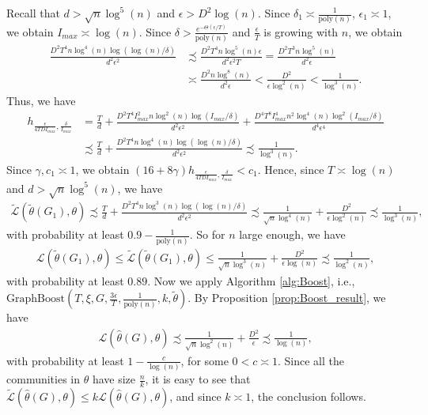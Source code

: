 \documentclass{article}
\newcommand{\thetahat}{\ensuremath{\widehat{\theta}}}
\begin{document}
Recall that $d > \sqrt{n}\log^5(n)$ and $\epsilon > D^2\log(n)$. Since $\delta_1 \asymp \frac{1}{\mathrm{poly}(n)}$, $\epsilon_1 \asymp 1$, we obtain $I_{max} \asymp \log(n)$. Since $\delta > \frac{e^{-\Theta(\epsilon/T)}}{\mathrm{poly}(n)}$ and $\frac{\epsilon}{T}$ is growing with $n$, we obtain
\begin{align*}
\frac{D^2T^4n\log^4(n)\log(\log(n)/\delta)}{d^2\epsilon^2} & \precsim \frac{D^2T^4n\log^5(n)\epsilon}{d^2\epsilon^2T} = \frac{D^2T^3n\log^5(n)}{d^2\epsilon} \\
%
& \asymp \frac{D^2n\log^8(n)}{d^2\epsilon} < \frac{D^2}{\epsilon\log^2(n)} < \frac{1}{\log^3(n)}.
\end{align*}
Thus, we have
\begin{align*}
h_{\frac{\epsilon}{4TDI_{max}}, \frac{\delta}{I_{max}}} &= \frac{T}{d} + \frac{D^2T^4I_{max}^2n\log^2(n)\log(I_{max}/\delta)}{d^2\epsilon^2} + \frac{D^4T^8I_{max}^4n^2\log^4(n)\log^2(I_{max}/\delta)}{d^4\epsilon^4}\\
&\precsim \frac{T}{d} + \frac{D^2T^4n\log^4(n)\log(\log(n)/\delta)}{d^2\epsilon^2} \precsim \frac{1}{\log^3(n)}.
\end{align*}
Since $\gamma, c_1 \asymp 1$, we obtain $(16 + 8\gamma)h_{\frac{\epsilon}{4TDI_{max}}, \frac{\delta}{I_{max}}} < c_1$. Hence, since $T \asymp \log(n)$ and $d > \sqrt{n}\log^5(n)$, we have
\begin{align*}
\widetilde{\mathcal{L}}\left(\widetilde{\theta}(G_1), \theta\right) \precsim \frac{T}{d} + \frac{D^2T^4n\log^3(n)\log(\log(n)/\delta)}{d^2\epsilon^2} \precsim \frac{1}{\sqrt{n}\log^4(n)} + \frac{D^2}{\epsilon\log^2(n)} \precsim \frac{1}{\log^3(n)},
\end{align*}
with probability at least $0.9 - \frac{1}{\mathrm{poly}(n)}$. So for $n$ large enough, we have
\begin{align*}
\mathcal{L}\left(\widetilde{\theta}(G_1), \theta\right) \leq \widetilde{\mathcal{L}}\left(\widetilde{\theta}(G_1), \theta\right) \leq \frac{1}{\sqrt{n}\log^3(n)} + \frac{D^2}{\epsilon\log(n)} \precsim \frac{1}{\log^2(n)},
\end{align*}
with probability at least $0.89$. Now we apply Algorithm \ref{alg:Boost}, i.e., $\mathrm{GraphBoost}\left(T, \xi, G, \frac{3\epsilon}{T}, \frac{1}{\mathrm{poly}(n)}, k, \widetilde{\theta}\right)$. By Proposition \ref{prop:Boost_result}, we have
\begin{align*}
\mathcal{L}\left(\thetahat(G), \theta\right) \precsim\frac{1}{\sqrt{n}\log^2(n)} + \frac{D^2}{\epsilon} \precsim \frac{1}{\log(n)},
\end{align*}
with probability at least $1 - \frac{c}{\log(n)}$, for some $0 < c \asymp 1$. Since all the communities in $\theta$ have size $\frac{n}{k}$, it is easy to see that $\widetilde{\mathcal{L}}\left(\thetahat(G), \theta\right) \leq k\mathcal{L}\left(\thetahat(G), \theta\right)$, and since $k \asymp 1$, the conclusion follows.
\end{document}
